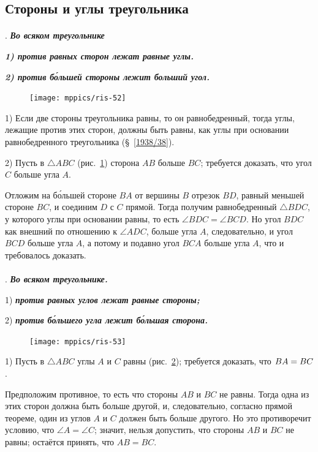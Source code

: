 \subsection*{Стороны и углы треугольника}

\paragraph{}\label{1938/46}
.
\textbf{\emph{Во всяком треугольнике}}

\textbf{\emph{1) против равных сторон лежат равные углы.}}

\textbf{\emph{2) против б\'{о}льшей стороны лежит больший угол.}}

\begin{figure}
\vskip-4mm
\centering
\texttt{[image: mppics/ris-52]}
\caption{}\label{1938/ris-52}
\end{figure}

1) Если две стороны треугольника равны, то он равнобедренный, тогда углы, лежащие против этих сторон, должны быть равны, как углы при основании равнобедренного треугольника (§~\ref{1938/38}).

2) Пусть в $\triangle ABC$ (рис.~\ref{1938/ris-52}) сторона $AB$ больше $BC$;
требуется доказать, что угол $C$ больше угла $A$.

Отложим на б\'{о}льшей стороне $BA$ от вершины $B$ отрезок $BD$, равный меньшей стороне $BC$, и соединим $D$ с $C$ прямой.
Тогда получим равнобедренный $\triangle BDC$, у которого углы при основании равны, то есть $\angle BDC=\angle BCD$.
Но угол $BDC$ как внешний по отношению к $\angle ADC$, больше угла $A$, следовательно, и угол $BCD$ больше угла $A$, а потому и подавно угол $BCA$ больше угла $A$, что и требовалось доказать.

\paragraph{}\label{1938/47}
\mbox{.}
\textbf{\emph{Во всяком треугольнике.}}

1) \textbf{\emph{против равных углов лежат равные стороны;}}

2) \textbf{\emph{против б\'{о}льшего угла лежит б\'{о}льшая сторона.}}

{

\begin{figure}
\centering
\texttt{[image: mppics/ris-53]}
\caption{}\label{1938/ris-53}
\end{figure}

1) Пусть в $\triangle ABC$ углы $A$ и $C$ равны (рис.~\ref{1938/ris-53});
требуется доказать, что $BA \z= BC$.

Предположим противное, то есть что стороны $AB$ и $BC$ не равны.
Тогда одна из этих сторон должна быть больше другой, и, следовательно, согласно прямой теореме, один из углов $A$ и $C$ должен быть больше другого.
Но это противоречит условию, что $\angle A = \angle C$;
значит, нельзя допустить, что стороны $AB$ и $BC$ не равны;
остаётся принять, что $AB=BC$.

}

